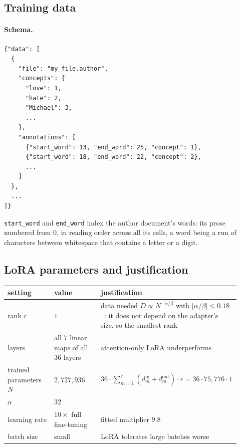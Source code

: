 \documentclass[11pt]{article}
\theoremstyle{remark}
\begin{document}
\FloatBarrier
\subsection{Training data}\label{sec:data}

\paragraph{Schema.}
\begin{verbatim}
{"data": [
  {
    "file": "my_file.author",
    "concepts": {
      "love": 1,
      "hate": 2,
      "Michael": 3,
      ...
    },
    "annotations": [
      {"start_word": 13, "end_word": 25, "concept": 1},
      {"start_word": 18, "end_word": 22, "concept": 2},
      ...
    ]
  },
  ...
]}
\end{verbatim}
\texttt{start\_word} and \texttt{end\_word} index the author document's words: its prose numbered from $0$, in reading order across all its cells, a word being a run of characters between whitespace that contains a letter or a digit.

\subsection{LoRA parameters and justification}\label{sec:lora}

\begin{center}
\small
\begin{tabular}{@{}p{0.2\linewidth} p{0.2\linewidth} p{0.52\linewidth}@{}}
\hline
setting & value & justification \\
\hline
rank $r$ & $1$ & data needed $D \propto N^{-\alpha/\beta}$ with $|\alpha/\beta| \le 0.18$~\cite{zhang}: it does not depend on the adapter's size, so the smallest rank \\
layers & all $7$ linear maps of all $36$ layers & attention-only LoRA underperforms~\cite{thinkingmachines} \\
trained parameters $N$ & $2{,}727{,}936$ & $36 \cdot \sum_{m=1}^{7} (d^{\text{in}}_m + d^{\text{out}}_m) \cdot r = 36 \cdot 75{,}776 \cdot 1$ \\
$\alpha$ & $32$ & \cite{thinkingmachines} \\
learning rate & $10\times$ full fine-tuning & fitted multiplier $9.8$~\cite{thinkingmachines} \\
batch size & small & LoRA tolerates large batches worse~\cite{thinkingmachines} \\
\hline
\hline
\end{tabular}
\end{center}
\end{document}
